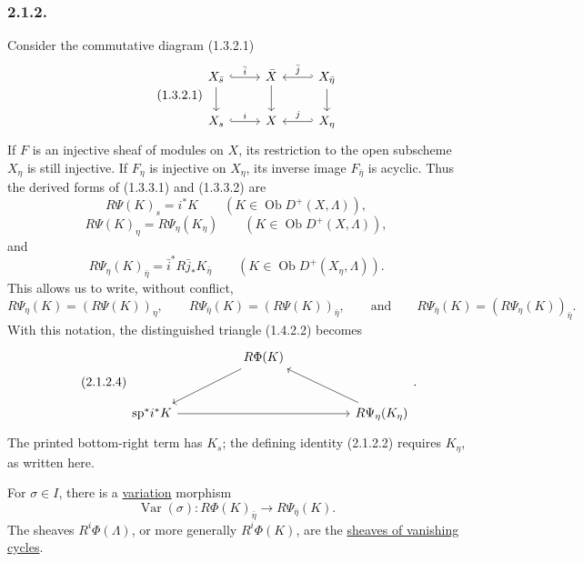 \subsubsection*{2.1.2.}
Consider the commutative diagram (1.3.2.1)
\begin{equation}\tag{1.3.2.1}
\begin{tikzcd}
X_{\bar s} \arrow[r, hook, "\bar i"] \arrow[d]
  & \bar X \arrow[d]
  & X_{\bar\eta} \arrow[l, hook', "\bar j"'] \arrow[d] \\
X_s \arrow[r, hook, "i"] & X & X_\eta \arrow[l, hook', "j"']
\end{tikzcd}
\end{equation}
If $F$ is an injective sheaf of modules on $X$, its restriction to the
open subscheme $X_\eta$ is still injective.  If $F_\eta$ is injective
on $X_\eta$, its inverse image $F_{\bar\eta}$ is acyclic.  Thus the
derived forms of (1.3.3.1) and (1.3.3.2) are
\begin{equation}\tag{2.1.2.1}
R\Psi(K)_s=i^*K
\qquad(K\in\operatorname{Ob}D^+(X,\Lambda)),
\end{equation}
\begin{equation}\tag{2.1.2.2}
R\Psi(K)_\eta=R\Psi_\eta(K_\eta)
\qquad(K\in\operatorname{Ob}D^+(X,\Lambda)),
\end{equation}
and
\begin{equation}\tag{2.1.2.3}
R\Psi_\eta(K)_{\bar\eta}
=\bar i^*R\bar j_*K_{\bar\eta}
\qquad(K\in\operatorname{Ob}D^+(X_\eta,\Lambda)).
\end{equation}
This allows us to write, without conflict,
\begin{equation*}
R\Psi_\eta(K)=(R\Psi(K))_\eta,
\qquad
R\Psi_{\bar\eta}(K)=(R\Psi(K))_{\bar\eta},
\qquad\text{and}\qquad
R\Psi_{\bar\eta}(K)=(R\Psi_\eta(K))_{\bar\eta}.
\end{equation*}
With this notation, the distinguished triangle (1.4.2.2) becomes
\begin{equation}\tag{2.1.2.4}
\begin{tikzcd}[row sep=large, column sep=huge]
{} & R\Phi(K) \arrow[dl] & {} \\
\mathrm{sp}^*i^*K \arrow[rr] & {}
  & R\Psi_\eta(K_\eta) \arrow[ul]
\end{tikzcd}
.\end{equation}
The printed bottom-right term has $K_s$; the defining identity
(2.1.2.2) requires $K_\eta$, as written here.

For $\sigma\in I$, there is a \underline{variation} morphism
\begin{equation}\tag{2.1.2.5}
\operatorname{Var}(\sigma):R\Phi(K)_{\bar\eta}
\longrightarrow R\Psi_{\bar\eta}(K).
\end{equation}
The sheaves $R^i\Phi(\Lambda)$, or more generally $R^i\Phi(K)$, are
the \underline{sheaves of vanishing cycles}.

